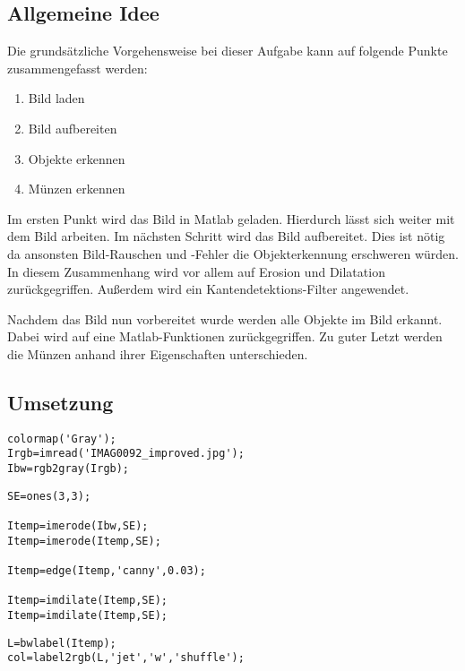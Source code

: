\documentclass[a4paper,DIV=calc,ngerman]{scrartcl}
\begin{document}
\subsection{Allgemeine Idee}
\label{sec:a1idee}
Die grundsätzliche Vorgehensweise bei dieser Aufgabe kann auf folgende Punkte zusammengefasst werden:

\begin{enumerate}
    \item Bild laden
    \item Bild aufbereiten
    \item Objekte erkennen
    \item Münzen erkennen
\end{enumerate}

Im ersten Punkt wird das Bild in Matlab geladen. Hierdurch lässt sich weiter mit dem Bild arbeiten. Im nächsten Schritt wird das Bild aufbereitet. Dies ist nötig da ansonsten Bild-Rauschen und -Fehler die Objekterkennung erschweren würden. In diesem Zusammenhang wird vor allem auf Erosion und Dilatation zurückgegriffen. Außerdem wird ein Kantendetektions-Filter angewendet.

Nachdem das Bild nun vorbereitet wurde werden alle Objekte im Bild erkannt. Dabei wird auf eine Matlab-Funktionen zurückgegriffen. Zu guter Letzt werden die Münzen anhand ihrer Eigenschaften unterschieden.


\subsection{Umsetzung}
\label{sec:a1umsetzung}


\begin{lstlisting}[frame=single, float, caption={Bild einlesen}, label={lst:bildeinlesen}]
colormap('Gray');
Irgb=imread('IMAG0092_improved.jpg');
Ibw=rgb2gray(Irgb);
\end{lstlisting}

\begin{lstlisting}[frame=single, float, caption={Bild-Aufbereitung}, label={lst:bildaufbereitung}]
SE=ones(3,3);

Itemp=imerode(Ibw,SE);
Itemp=imerode(Itemp,SE);

Itemp=edge(Itemp,'canny',0.03);

Itemp=imdilate(Itemp,SE);
Itemp=imdilate(Itemp,SE);
\end{lstlisting}


\begin{lstlisting}[frame=single, float, caption={Bild-Aufbereitung}, label={lst:bildaufbereitung}]
L=bwlabel(Itemp);
col=label2rgb(L,'jet','w','shuffle');
\end{lstlisting}
\end{document}
